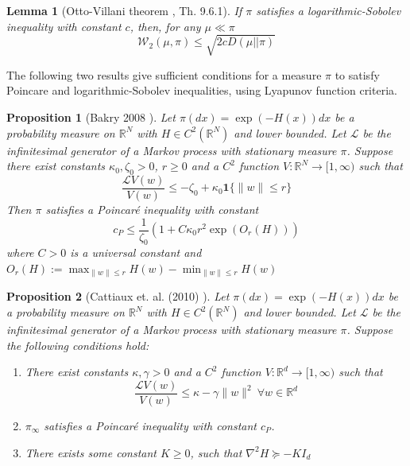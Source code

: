 \documentclass[journal,onecolumn]{IEEEtran}
\newtheorem{lemma}{Lemma}
\newtheorem{proposition}{Proposition}
\newcommand{\grad}{\nabla}
\newcommand{\reals}{\mathbb{R}}
\newcommand{\dimn}{N}
\newcommand{\wass}{\mathcal{W}_2}
\newcommand{\KL}{D}
\newcommand{\gibbs}{\ids_{\infty}}
\newcommand{\pconst}{c_P}
\newcommand{\bc}{\kappa_0}
\newcommand{\bcc}{\zeta_0}
\newcommand{\bccc}{r}
\newcommand{\gen}{\mathcal{L}}
\newcommand{\ind}{\boldsymbol{1}}
\newcommand{\ids}{\pi}
\begin{document}
{\begin{lemma}[Otto-Villani theorem \cite{bakry2014analysis}, Th. 9.6.1] 
If $\pi$ satisfies a logarithmic-Sobolev inequality with constant $c$, then, for any $\mu \ll \pi$
\label{lem:OVthm}
\begin{equation*}
    \wass(\mu,\pi) \leq \sqrt{2c\KL(\mu||\pi)}
\end{equation*}
\end{lemma}

The following two results give sufficient conditions for a measure $\pi$ to satisfy Poincare and logarithmic-Sobolev inequalities, using Lyapunov function criteria. 

\begin{proposition}[Bakry 2008 \cite{bakry2008simple}]
\label{prop:Bakry}
Let $\pi(dx) = \exp(-H(x))dx$ be a probability measure on $\reals^{\dimn}$ with $H \in C^2(\reals^{\dimn})$ and lower bounded. Let $\gen$ be the infinitesimal generator of a Markov process with stationary measure $\pi$. Suppose there exist constants $\bc, \bcc > 0$, $\bccc\geq 0$ and a $C^2$ function $V: \reals^{\dimn} \to [1,\infty)$ such that
\begin{equation}
\label{eq:lyapcondb}
    \frac{\gen V(w)}{V(w)} \leq -\bcc + \bc\ind\{\|w\|\leq \bccc\}
\end{equation}
Then $\pi$ satisfies a Poincar\'e inequality with constant 
\begin{equation*}
    \pconst \leq \frac{1}{\bcc}\left(1 + C\bc\bccc^2\exp(O_{\bccc}(H)) \right)
\end{equation*}
where $C>0$ is a universal constant and $O_{\bccc}(H) := \max_{\|w\|\leq \bccc}H(w) - \min_{\|w\|\leq \bccc}H(w)$
\end{proposition}

\begin{proposition}[Cattiaux et. al. (2010) \cite{cattiaux2008note}]
\label{prop:cat}
Let $\pi(dx) = \exp(-H(x))dx$ be a probability measure on $\reals^{\dimn}$ with $H \in C^2(\reals^{\dimn})$ and lower bounded. Let $\gen$ be the infinitesimal generator of a Markov process with stationary measure $\pi$.
Suppose the following conditions hold:
\begin{enumerate}
\item There exist constants $\kappa, \gamma > 0$ and a $C^2$ function $V: \reals^d \rightarrow [1,\infty)$ such that 
\begin{equation}
\label{eq:lyapcond}
    \frac{\gen V(w)}{V(w)} \leq \kappa - \gamma \|w\|^2  \ \forall w \in \reals^d
\end{equation}
\item $\gibbs$ satisfies a Poincar\'e inequality with constant $\pconst$.
\item There exists some constant $K \geq 0$, such that $\grad^2 H \succcurlyeq -K I_d$
\end{enumerate}


\end{proposition}}
\end{document}
